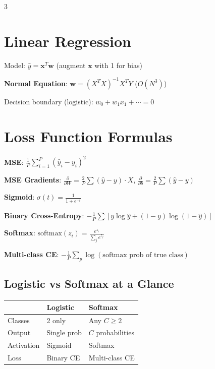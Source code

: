 \documentclass[6pt,landscape,a4paper]{extarticle}
\begin{document}
\begin{multicols}{3}

\section{Linear Regression}

Model: $\hat{y} = \mathbf{x}^T\mathbf{w}$ \quad (augment $\mathbf{x}$ with 1 for bias)

\textbf{Normal Equation}: $\mathbf{w} = (X^TX)^{-1}X^TY$ \quad ($O(N^3)$)

Decision boundary (logistic): $w_0 + w_1x_1 + \cdots = 0$

\section{Loss Function Formulas}

\textbf{MSE}: $\frac{1}{P}\sum_{i=1}^{P}(\hat{y}_i - y_i)^2$

\textbf{MSE Gradients}: $\frac{\partial}{\partial W} = \frac{2}{P}\sum(\hat{y}-y)\cdot X$, \quad $\frac{\partial}{\partial b} = \frac{2}{P}\sum(\hat{y}-y)$

\textbf{Sigmoid}: $\sigma(t) = \frac{1}{1+e^{-t}}$

\textbf{Binary Cross-Entropy}: $-\frac{1}{P}\sum[y\log\hat{y} + (1\!-\!y)\log(1\!-\!\hat{y})]$

\textbf{Softmax}: $\text{softmax}(z_i) = \frac{e^{z_i}}{\sum_j e^{z_j}}$

\textbf{Multi-class CE}: $-\frac{1}{P}\sum_p \log(\text{softmax prob of true class})$

\subsection{Logistic vs Softmax at a Glance}
\begin{tabular}{@{}l|l|l@{}}
& \textbf{Logistic} & \textbf{Softmax} \\\hline
Classes & 2 only & Any $C\ge2$ \\
Output & Single prob & $C$ probabilities \\
Activation & Sigmoid & Softmax \\
Loss & Binary CE & Multi-class CE \\
\end{tabular}


\end{multicols}
\end{document}
